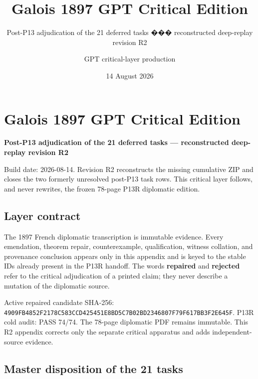 \documentclass[
  10pt,
  a4paper,
]{scrreprt}
\title{Galois 1897 GPT Critical Edition}
\subtitle{Post-P13 adjudication of the 21 deferred tasks ���
reconstructed deep-replay revision R2}
\author{GPT critical-layer production}
\date{14 August 2026}
\begin{document}
\maketitle

{
\hypersetup{linkcolor=}
\setcounter{tocdepth}{1}
\tableofcontents
}
\chapter{Galois 1897 GPT Critical
Edition}\label{galois-1897-gpt-critical-edition}

\textbf{Post-P13 adjudication of the 21 deferred tasks --- reconstructed
deep-replay revision R2}

Build date: 2026-08-14. Revision R2 reconstructs the missing cumulative
ZIP and closes the two formerly unresolved post-P13 task rows. This
critical layer follows, and never rewrites, the frozen 78-page P13R
diplomatic edition.

\section{Layer contract}\label{layer-contract}

The 1897 French diplomatic transcription is immutable evidence. Every
emendation, theorem repair, counterexample, qualification, witness
collation, and provenance conclusion appears only in this appendix and
is keyed to the stable IDs already present in the P13R handoff. The
words \textbf{repaired} and \textbf{rejected} refer to the critical
adjudication of a printed claim; they never describe a mutation of the
diplomatic source.

Active repaired candidate SHA-256:
\texttt{4909FB4852F2178C583CCD425451E8BD5C7B02BD2346807F79F617BB3F2E645F}.
P13R cold audit: PASS 74/74. The 78-page diplomatic PDF remains
immutable. This R2 appendix corrects only the separate critical
apparatus and adds independent-source evidence.

\section{Master disposition of the 21
tasks}\label{master-disposition-of-the-21-tasks}
\end{document}
